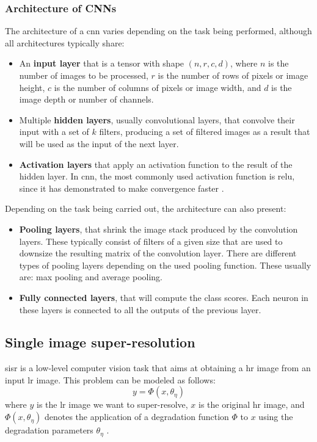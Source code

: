 \subsubsection*{Architecture of CNNs}
The architecture of a \gls{cnn} varies depending on the task being performed, although all architectures typically share:
\begin{itemize}
	\item An \textbf{input layer} that is a tensor with shape 
	$(n, r, c, d)$, where $n$ is the number of images to be processed, $r$ is the number of rows of pixels or image height, $c$ is the number of columns of pixels or image width, and $d$ is the image depth or number of channels.
	\item Multiple \textbf{hidden layers}, usually convolutional layers, that convolve their input with a set of $k$ filters, producing a set of filtered images as a result that will be used as the input of the next layer.
	\item \textbf{Activation layers} that apply an activation function to the result of the hidden layer. In \gls{cnn}, the most commonly used activation function is \gls{relu}, since it has demonstrated to make convergence faster \cite{RELU}.
\end{itemize}

Depending on the task being carried out, the architecture can also present:
\begin{itemize}
	\item \textbf{Pooling layers}, that shrink the image stack produced by the convolution layers. These typically consist of filters of a given size that are used to downsize the resulting matrix of the convolution layer. There are different types of pooling layers depending on the used pooling function. These usually are: max pooling and average pooling.
	\item \textbf{Fully connected layers}, that will compute the class scores. Each neuron in these layers is connected to all the outputs of the previous layer.
\end{itemize}

\subsection{Single image super-resolution}

\gls{sisr} is a low-level computer vision task that aims at obtaining a \gls{hr} image from an input \gls{lr} image. This problem can be modeled as follows:
$$y = \Phi(x, \theta_\eta)$$
where $y$ is the \gls{lr} image we want to super-resolve, $x$ is the original \gls{hr} image, and $\Phi(x, \theta_\eta)$ denotes the application of a degradation function $\Phi$ to $x$ using the degradation parameters $\theta_\eta$ \cite{DBLP:SISR}. 


